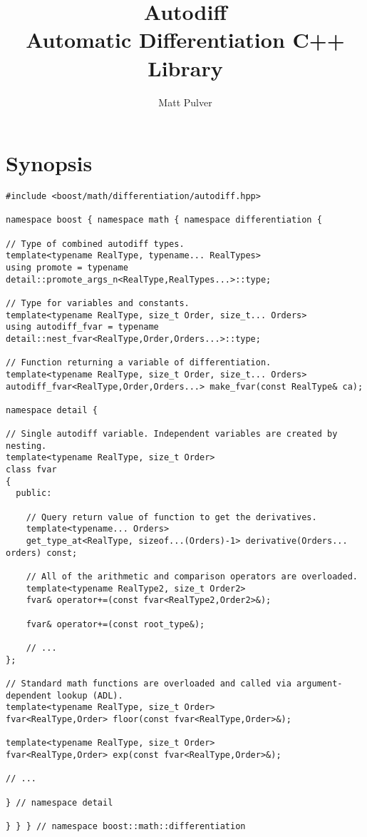 \documentclass{article}
\begin{document}
\title{Autodiff \\ Automatic Differentiation C++ Library}
\author{Matt Pulver}
\maketitle



\section{Synopsis}

\begingroup
\fontsize{10pt}{10pt}\selectfont
\begin{verbatim}
#include <boost/math/differentiation/autodiff.hpp>

namespace boost { namespace math { namespace differentiation {

// Type of combined autodiff types.
template<typename RealType, typename... RealTypes>
using promote = typename detail::promote_args_n<RealType,RealTypes...>::type;

// Type for variables and constants.
template<typename RealType, size_t Order, size_t... Orders>
using autodiff_fvar = typename detail::nest_fvar<RealType,Order,Orders...>::type;

// Function returning a variable of differentiation.
template<typename RealType, size_t Order, size_t... Orders>
autodiff_fvar<RealType,Order,Orders...> make_fvar(const RealType& ca);

namespace detail {

// Single autodiff variable. Independent variables are created by nesting.
template<typename RealType, size_t Order>
class fvar
{
  public:

    // Query return value of function to get the derivatives.
    template<typename... Orders>
    get_type_at<RealType, sizeof...(Orders)-1> derivative(Orders... orders) const;

    // All of the arithmetic and comparison operators are overloaded.
    template<typename RealType2, size_t Order2>
    fvar& operator+=(const fvar<RealType2,Order2>&);

    fvar& operator+=(const root_type&);

    // ...
};

// Standard math functions are overloaded and called via argument-dependent lookup (ADL).
template<typename RealType, size_t Order>
fvar<RealType,Order> floor(const fvar<RealType,Order>&);

template<typename RealType, size_t Order>
fvar<RealType,Order> exp(const fvar<RealType,Order>&);

// ...

} // namespace detail

} } } // namespace boost::math::differentiation
\end{verbatim}
\endgroup
\end{document}

